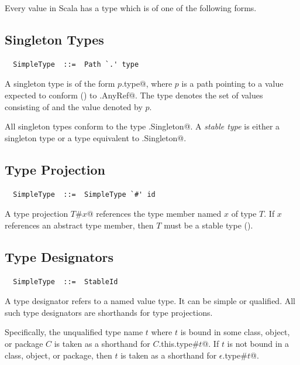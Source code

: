 Every value in Scala has a type which is of one of the following
forms.

\subsection{Singleton Types}
\label{sec:singleton-types}

\syntax\begin{lstlisting}
  SimpleType  ::=  Path `.' type
\end{lstlisting}

A singleton type is of the form \lstinline@$p$.type@, where $p$ is a
path pointing to a value expected to conform ()
to \lstinline@scala.AnyRef@.  The type denotes the set of values
consisting of  and the value denoted by $p$. 

All singleton types conform to the type \lstinline@scala.Singleton@.
A {\em stable type} is either a singleton type or a type equivalent to 
\lstinline@scala.Singleton@.

\subsection{Type Projection}
\label{sec:type-project}

\syntax\begin{lstlisting} 
  SimpleType  ::=  SimpleType `#' id
\end{lstlisting}

A type projection \lstinline@$T$#$x$@ references the type member named
$x$ of type $T$. If $x$ references an abstract type member, then $T$
must be a stable type (). 

\subsection{Type Designators}
\label{sec:type-desig}

\syntax\begin{lstlisting}
  SimpleType  ::=  StableId
\end{lstlisting}

A type designator refers to a named value type. It can be simple or
qualified. All such type designators are shorthands for type projections.

Specifically, the unqualified type name $t$ where $t$ is bound in some
class, object, or package $C$ is taken as a shorthand for
\lstinline@$C$.this.type#$t$@.  If $t$ is not bound in a class, object, or
package, then $t$ is taken as a shorthand for
\lstinline@$\epsilon$.type#$t$@.

